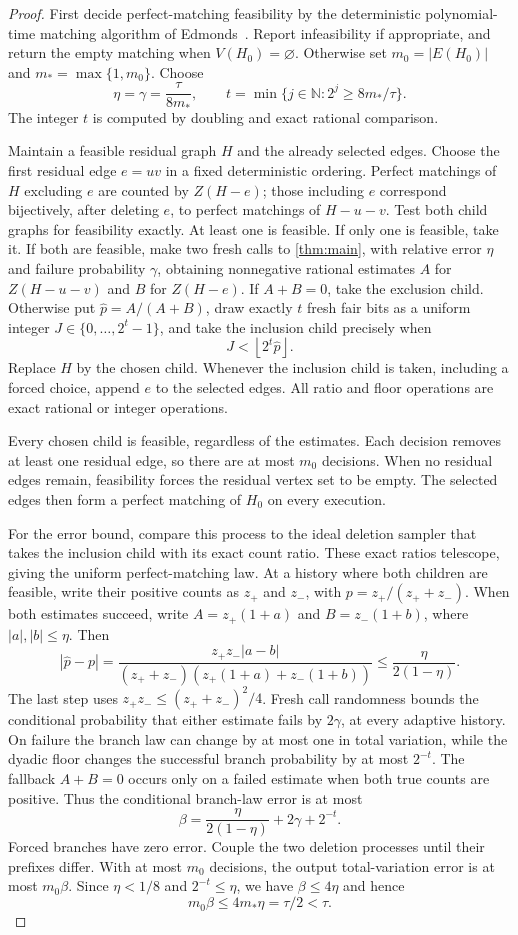 \documentclass[11pt]{article}
\theoremstyle{definition}
\theoremstyle{remark}
\newcommand{\floor}[1]{\left\lfloor#1\right\rfloor}
\numberwithin{equation}{section}
\begin{document}
\begin{proof}
First decide perfect-matching feasibility by the deterministic
polynomial-time matching algorithm of Edmonds~\cite{Edmonds1965}. Report
infeasibility if appropriate, and return the empty matching when
$V(H_0)=\varnothing$. Otherwise set $m_0=|E(H_0)|$ and
$m_*=\max\{1,m_0\}$. Choose
\[
 \eta=\gamma=\frac{\tau}{8m_*},\qquad
 t=\min\{j\in\mathbb N:2^j\ge 8m_*/\tau\}.
\]
The integer $t$ is computed by doubling and exact rational comparison.

Maintain a feasible residual graph $H$ and the already selected edges.
Choose the first residual edge $e=uv$ in a fixed deterministic ordering.
Perfect matchings of $H$ excluding $e$ are counted by $Z(H-e)$; those
including $e$ correspond bijectively, after deleting $e$, to perfect
matchings of $H-u-v$. Test both child graphs for feasibility exactly.
At least one is feasible. If only one is feasible, take it. If both are
feasible, make two fresh calls to \cref{thm:main}, with relative error
$\eta$ and failure probability $\gamma$, obtaining nonnegative rational
estimates $A$ for $Z(H-u-v)$ and $B$ for $Z(H-e)$. If $A+B=0$, take the
exclusion child. Otherwise put $\widehat p=A/(A+B)$, draw exactly $t$
fresh fair bits as a uniform integer $J\in\{0,\ldots,2^t-1\}$, and take the
inclusion child precisely when
\[
 J<\floor{2^t\widehat p}.
\]
Replace $H$ by the chosen child. Whenever the inclusion child is taken,
including a forced choice, append $e$ to the selected edges. All ratio and
floor operations are exact rational or integer operations.

Every chosen child is feasible, regardless of the estimates. Each decision
removes at least one residual edge, so there are at most $m_0$ decisions.
When no residual edges remain, feasibility forces the residual vertex set
to be empty. The selected edges then form a perfect matching of $H_0$ on
every execution.

For the error bound, compare this process to the ideal deletion sampler
that takes the inclusion child with its exact count ratio. These exact
ratios telescope, giving the uniform perfect-matching law. At a history
where both children are feasible, write their positive counts as $z_+$ and
$z_-$, with $p=z_+/(z_++z_-)$. When both estimates succeed, write
$A=z_+(1+a)$ and $B=z_-(1+b)$, where $|a|,|b|\le\eta$. Then
\[
 |\widehat p-p|
 =\frac{z_+z_-|a-b|}
 {(z_++z_-)(z_+(1+a)+z_-(1+b))}
 \le\frac{\eta}{2(1-\eta)}.
\]
The last step uses $z_+z_-\le(z_++z_-)^2/4$. Fresh call randomness bounds
the conditional probability that either estimate fails by $2\gamma$,
at every adaptive history. On failure the branch law can change by at most
one in total variation, while the dyadic floor changes the successful
branch probability by at most $2^{-t}$. The fallback $A+B=0$ occurs only
on a failed estimate when both true counts are positive. Thus the
conditional branch-law error is at most
\[
 \beta=\frac{\eta}{2(1-\eta)}+2\gamma+2^{-t}.
\]
Forced branches have zero error. Couple the two deletion processes until
their prefixes differ. With at most $m_0$ decisions, the output
total-variation error is at most $m_0\beta$. Since $\eta<1/8$ and
$2^{-t}\le\eta$, we have $\beta\le4\eta$ and hence
\[
 m_0\beta\le4m_*\eta=\tau/2<\tau.
\]


\end{proof}
\end{document}
